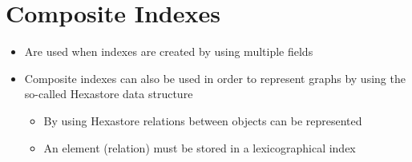 \section{Composite Indexes}
\begin{itemize}
\item Are used when indexes are created by using multiple fields
\item Composite indexes can also be used in order to represent graphs by using the so-called Hexastore data structure
\begin{itemize}
\item By using Hexastore relations between objects can be represented
\item An element (relation) must be stored in a lexicographical index
\end{itemize}
\end{itemize}





